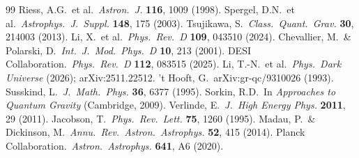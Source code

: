 \documentclass[12pt,a4paper]{article}
\begin{document}
\begin{thebibliography}{99}
 Riess, A.G.\ et al.\ {\it Astron.\ J.} {\bf 116}, 1009 (1998).
 Spergel, D.N.\ et al.\ {\it Astrophys.\ J.\ Suppl.} {\bf 148}, 175 (2003).
 Tsujikawa, S.\ {\it Class.\ Quant.\ Grav.} {\bf 30}, 214003 (2013).
 Li, X.\ et al.\ {\it Phys.\ Rev.\ D} {\bf 109}, 043510 (2024).
 Chevallier, M.\ \& Polarski, D.\ {\it Int.\ J.\ Mod.\ Phys.\ D} {\bf 10}, 213 (2001).
 DESI Collaboration.\ {\it Phys.\ Rev.\ D} {\bf 112}, 083515 (2025).
 Li, T.-N.\ et al.\ {\it Phys.\ Dark Universe} (2026); arXiv:2511.22512.
 't Hooft, G.\ arXiv:gr-qc/9310026 (1993).
 Susskind, L.\ {\it J.\ Math.\ Phys.} {\bf 36}, 6377 (1995).
 Sorkin, R.D.\ In {\it Approaches to Quantum Gravity} (Cambridge, 2009).
 Verlinde, E.\ {\it J.\ High Energy Phys.} {\bf 2011}, 29 (2011).
 Jacobson, T.\ {\it Phys.\ Rev.\ Lett.} {\bf 75}, 1260 (1995).
 Madau, P.\ \& Dickinson, M.\ {\it Annu.\ Rev.\ Astron.\ Astrophys.} {\bf 52}, 415 (2014).
 Planck Collaboration.\ {\it Astron.\ Astrophys.} {\bf 641}, A6 (2020).
\end{thebibliography}
\end{document}
